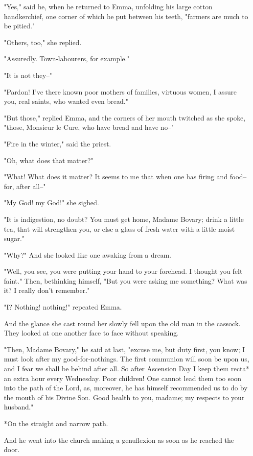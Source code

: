 \documentclass{tufte-book}
\begin{document}
"Yes," said he, when he returned to Emma, unfolding his large cotton
handkerchief, one corner of which he put between his teeth, "farmers are
much to be pitied."

"Others, too," she replied.

"Assuredly. Town-labourers, for example."

"It is not they--"

"Pardon! I've there known poor mothers of families, virtuous women, I
assure you, real saints, who wanted even bread."

"But those," replied Emma, and the corners of her mouth twitched as she
spoke, "those, Monsieur le Cure, who have bread and have no--"

"Fire in the winter," said the priest.

"Oh, what does that matter?"

"What! What does it matter? It seems to me that when one has firing and
food--for, after all--"

"My God! my God!" she sighed.

"It is indigestion, no doubt? You must get home, Madame Bovary; drink
a little tea, that will strengthen you, or else a glass of fresh water
with a little moist sugar."

"Why?" And she looked like one awaking from a dream.

"Well, you see, you were putting your hand to your forehead. I thought
you felt faint." Then, bethinking himself, "But you were asking me
something? What was it? I really don't remember."

"I? Nothing! nothing!" repeated Emma.

And the glance she cast round her slowly fell upon the old man in the
cassock. They looked at one another face to face without speaking.

"Then, Madame Bovary," he said at last, "excuse me, but duty first, you
know; I must look after my good-for-nothings. The first communion will
soon be upon us, and I fear we shall be behind after all. So after
Ascension Day I keep them recta* an extra hour every Wednesday. Poor
children! One cannot lead them too soon into the path of the Lord, as,
moreover, he has himself recommended us to do by the mouth of his Divine
Son. Good health to you, madame; my respects to your husband."

     *On the straight and narrow path.

And he went into the church making a genuflexion as soon as he reached
the door.
\end{document}
